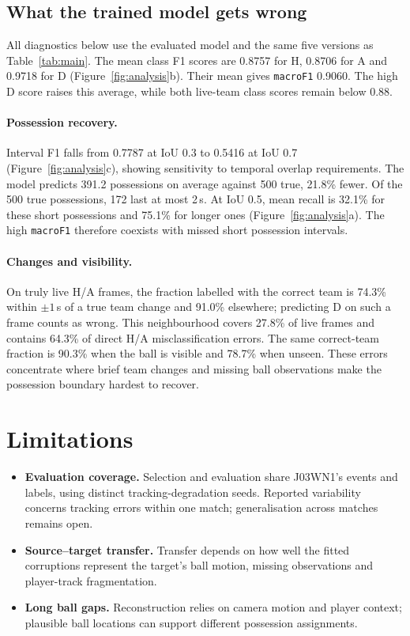 \documentclass[10pt,a4paper,twocolumn]{article}
\newcommand{\macroF}{\texttt{macroF1}}
\begin{document}
\subsection{What the trained model gets wrong}

All diagnostics below use the evaluated model and the same five versions as Table~\ref{tab:main}.
The mean class F1 scores are 0.8757 for H, 0.8706 for A and 0.9718 for D
(Figure~\ref{fig:analysis}b). Their mean gives \macroF{} 0.9060. The high D score raises this
average, while both live-team class scores remain below 0.88.

\paragraph{Possession recovery.} Interval F1 falls from 0.7787 at IoU 0.3 to 0.5416 at IoU 0.7
(Figure~\ref{fig:analysis}c), showing sensitivity to temporal overlap requirements. The model
predicts 391.2 possessions on average against 500 true, 21.8\% fewer. Of the 500 true possessions,
172 last at most 2\,s. At IoU 0.5, mean recall is 32.1\% for these short possessions and 75.1\%
for longer ones (Figure~\ref{fig:analysis}a). The high \macroF{} therefore coexists with missed
short possession intervals.

\paragraph{Changes and visibility.} On truly live H/A frames, the fraction labelled with the
correct team is 74.3\% within $\pm1$\,s of a true team change and 91.0\% elsewhere; predicting D
on such a frame counts as wrong. This neighbourhood covers 27.8\% of live frames and contains
64.3\% of direct H/A misclassification errors. The same correct-team fraction is 90.3\% when
the ball is visible and 78.7\% when unseen. These errors concentrate where brief team changes
and missing ball observations make the possession boundary hardest to recover.

\section{Limitations}

\begin{itemize}
  \item \textbf{Evaluation coverage.} Selection and evaluation share J03WN1's events and labels,
        using distinct tracking-degradation seeds. Reported variability concerns tracking errors
        within one match; generalisation across matches remains open.
  \item \textbf{Source--target transfer.} Transfer depends on how well the fitted corruptions
        represent the target's ball motion, missing observations and player-track fragmentation.
  \item \textbf{Long ball gaps.} Reconstruction relies on camera motion and player context;
        plausible ball locations can support different possession assignments.
\end{itemize}
\end{document}
